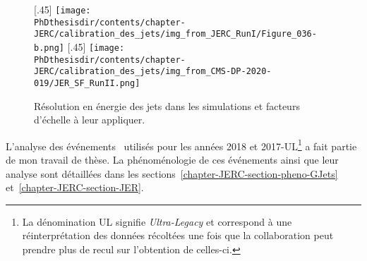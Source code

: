 \begin{figure}[h]
\centering
{}[.45\textwidth]
{\texttt{[image: \\PhDthesisdir/contents/chapter-JERC/calibration\_des\_jets/img\_from\_JERC\_RunI/Figure\_036-b.png]}}
\hfill
{}[.45\textwidth]
{\texttt{[image: \\PhDthesisdir/contents/chapter-JERC/calibration\_des\_jets/img\_from\_CMS-DP-2020-019/JER\_SF\_RunII.png]}}
\caption[Résolution en énergie des jets.]{Résolution en énergie des jets dans les simulations et facteurs d'échelle à leur appliquer.}
\label{fig-chapter-JERC-section-CMS-subsec-JER}
\end{figure}
\par L'analyse des événements \Gjet\ utilisés pour les années 2018 et 2017-UL\footnote{La dénomination \og UL \fg{} signifie \emph{Ultra-Legacy} et correspond à une réinterprétation des données récoltées une fois que la collaboration peut prendre plus de recul sur l'obtention de celles-ci.} a fait partie de mon travail de thèse.
La phénoménologie de ces événements ainsi que leur analyse sont détaillées dans les sections~\ref{chapter-JERC-section-pheno-GJets} et~\ref{chapter-JERC-section-JER}.
